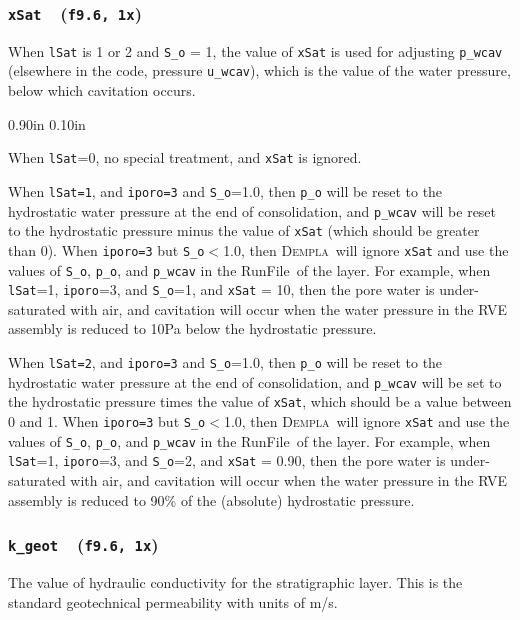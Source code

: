 \documentclass[letterpaper,11pt]{article}
\newcommand{\Dempla}{\textsc{Dempla}}
\newcommand{\Var}[2]{\texttt{#1}\ \  (\texttt{#2})}
\newcommand{\RunFile}{\textsf{RunFile}}
\newlength{\Labelwidth}
\newcommand{\Entrylabel}[1]{\makebox[\Labelwidth][r]{\texttt{#1}}}
\newenvironment{Options}
{\begin{list}{}{%
\renewcommand{\makelabel}{\Entrylabel}%
\setlength{\leftmargin} {0.90in}%
\setlength{\rightmargin}{0.00in}%
\setlength{\labelsep}   {0.10in}%
\setlength{\labelwidth} {\Labelwidth}%
}}
{\end{list}}
\begin{document}
\subsubsection[\texttt{xSat}]{\Var{xSat}{f9.6, 1x}}\label{sec:xSat}
When \texttt{lSat} is 1 or 2 and \texttt{S\_o} = 1,
the value of \texttt{xSat} is used for 
adjusting \texttt{p\_wcav}
(elsewhere in the code, pressure \texttt{u\_wcav}),
which is the value of the water pressure, 
below which cavitation occurs.
%
\begin{Options}
  \item[lSat=0]
    When \texttt{lSat}=0,
    no special treatment, and \texttt{xSat} is ignored.
  \item[lSat=1]
    When \texttt{lSat=1},
    and \texttt{iporo=3} and \texttt{S\_o}=1.0,
    then \texttt{p\_o} will be reset to the hydrostatic
    water pressure at the end of consolidation,
    and \texttt{p\_wcav}
    will be reset to the hydrostatic pressure
    minus the value of \texttt{xSat}
    (which should be greater than 0).
    When \texttt{iporo=3} but \texttt{S\_o}$<$1.0, then
    \Dempla\ will ignore \texttt{xSat} 
    and use the values of \texttt{S\_o},
    \texttt{p\_o}, and \texttt{p\_wcav} in the
    \RunFile\ of the layer.
    For example, when
    \texttt{lSat}=1, \texttt{iporo}=3,
    and \texttt{S\_o}=1, and \texttt{xSat} = 10,
    then the pore water is under-saturated with air,
    and cavitation will occur when the water pressure in the
    RVE assembly is reduced to 10Pa below the hydrostatic pressure.
  \item[lSat=2]
    When \texttt{lSat=2},
    and \texttt{iporo=3} and \texttt{S\_o}=1.0,
    then \texttt{p\_o} will be reset to the hydrostatic
    water pressure at the end of consolidation,
    and \texttt{p\_wcav}
    will be set to the hydrostatic pressure
    times the value of \texttt{xSat},
    which should be a value between 0 and 1.
    When \texttt{iporo=3} but \texttt{S\_o}$<$1.0, then
    \Dempla\ will ignore \texttt{xSat} 
    and use the values of \texttt{S\_o},
    \texttt{p\_o}, and \texttt{p\_wcav} in the
    \RunFile\ of the layer.
    For example, when
    \texttt{lSat}=1, \texttt{iporo}=3,
    and \texttt{S\_o}=2, and \texttt{xSat} = 0.90,
    then the pore water is under-saturated with air,
    and cavitation will occur when the water pressure in the
    RVE assembly is reduced to 90\% of the (absolute)
    hydrostatic pressure.
\end{Options}
%
%
\subsubsection[\texttt{k\_geot}]{\Var{k\_geot}{f9.6, 1x}}\label{sec:k_geot}
The value of hydraulic conductivity
for the stratigraphic layer.
This is the standard geotechnical permeability with units
of m/s.
%
%
\end{document}
